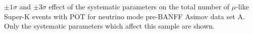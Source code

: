 \begin{table}
	\begin{adjustbox}{width=\textwidth, totalheight=\textheight, keepaspectratio}
		
	\end{adjustbox}
	\caption
	{
		$\pm1\sigma$ and $\pm3\sigma$ effect of the systematic parameters on the total number of $\mu$-like Super-K events with \RunPeriod POT for neutrino mode pre-BANFF Asimov data set A. Only the systematic parameters which affect this sample are shown.
	}
	\label{tab:sysvar_1rmu_prefit_Asimov_A}
\end{table}\clearpage